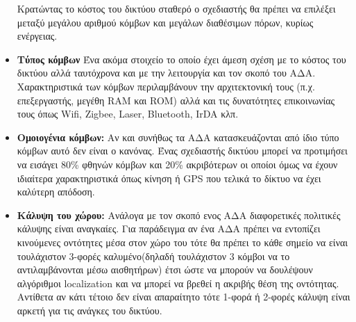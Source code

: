 \begin{itemize}
Κρατώντας το κόστος του δικτύου σταθερό ο σχεδιαστής θα πρέπει να επιλέξει μεταξύ μεγάλου αριθμού κόμβων και μεγάλων διαθέσιμων πόρων, κυρίως ενέργειας.
\item \textbf{Τύπος κόμβων} Ένα ακόμα στοιχείο το οποίο έχει άμεση σχέση με το κόστος του δικτύου αλλά ταυτόχρονα και με την λειτουργία και τον σκοπό του ΑΔΑ.
Χαρακτηριστικά των κόμβων περιλαμβάνουν την αρχιτεκτονική τους (π.χ. επεξεργαστής, μεγέθη RAM και ROM) αλλά και τις δυνατότητες επικοινωνίας τους όπως Wifi,
Zigbee, Laser, Bluetooth, IrDA κλπ.
\item \textbf{Ομοιογένια κόμβων:} Αν και συνήθως τα ΑΔΑ κατασκευάζονται από ίδιο τύπο κόμβων αυτό δεν είναι ο κανόνας.
Ένας σχεδιαστής δικτύου μπορεί να προτιμήσει να εισάγει 80\% φθηνών κόμβων και 20\% ακριβότερων οι οποίοι όμως να έχουν ιδιαίτερα χαρακτηριστικά όπως κίνηση ή GPS που
τελικά το δίκτυο να έχει καλύτερη απόδοση.
\item \textbf{Κάλυψη του χώρου:} Ανάλογα με τον σκοπό ενος ΑΔΑ διαφορετικές πολιτικές κάλυψης είναι αναγκαίες.
Για παράδειγμα αν ένα ΑΔΑ πρέπει να εντοπίζει κινούμενες οντότητες μέσα στον χώρο του τότε θα πρέπει το κάθε σημείο να είναι τουλάχιστον 3-φορές καλυμένο(δηλαδή
τουλάχιστον 3 κόμβοι να το αντιλαμβάνονται μέσω αισθητήρων) έτσι ώστε να μπορούν να δουλέψουν αλγόριθμοι localization και να μπορεί να βρεθεί η ακριβής θέση της
οντότητας.
Αντίθετα αν κάτι τέτοιο δεν είναι απαραίτητο τότε 1-φορά ή 2-φορές κάλυψη είναι αρκετή για τις ανάγκες του δικτύου.
\end{itemize}

